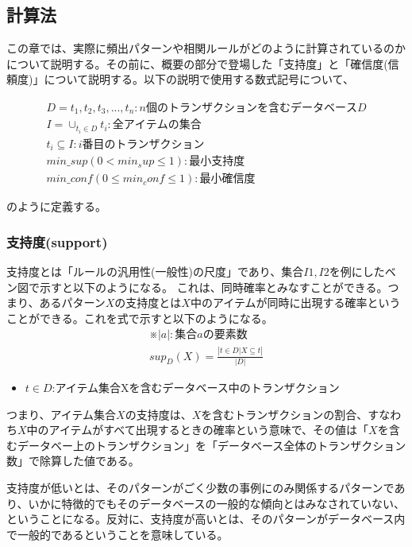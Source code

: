 \documentclass[dvipdfmx]{jsarticle}
\begin{document}
\subsection{計算法}
この章では、実際に頻出パターンや相関ルールがどのように計算されているのかについて説明する。その前に、概要の部分で登場した「支持度」と「確信度(信頼度)」について説明する。以下の説明で使用する数式記号について、
\begin{center}
  \begin{gather*}
    D = {t_{1}, t_{2}, t_{3},..., t_{n}}:n個のトランザクションを含むデータベースD\\
    I = \cup_{t_{i}\in D}t_{i}:全アイテムの集合 \\
    t_{i} \subseteq I:i番目のトランザクション \\
    min\_sup(0 < min_sup \le 1):最小支持度 \\
    min\_conf(0 \le min_conf \le 1):最小確信度
  \end{gather*}
\end{center}
のように定義する。
\subsubsection{支持度(support)}
支持度とは「ルールの汎用性(一般性)の尺度」であり、集合$I1, I2$を例にしたベン図で示すと以下のようになる。
これは、同時確率とみなすことができる。つまり、あるパターン$X$の支持度とは$X$中のアイテムが同時に出現する確率ということができる。これを式で示すと以下のようになる。
\begin{gather*}
  ※|a|:集合aの要素数\\
  sup_{D}(X) = \frac{|{t\in D|X\subseteq t}|}{|D|}
\end{gather*}
\begin{itemize}
  \item $t \in D$:アイテム集合Xを含むデータベース中のトランザクション
\end{itemize}
つまり、アイテム集合$X$の支持度は、$X$を含むトランザクションの割合、すなわち$X$中のアイテムがすべて出現するときの確率という意味で、その値は「$X$を含むデータベー上のトランザクション」を「データベース全体のトランザクション数」で除算した値である。\par
支持度が低いとは、そのパターンがごく少数の事例にのみ関係するパターンであり、いかに特徴的でもそのデータベースの一般的な傾向とはみなされていない、ということになる。反対に、支持度が高いとは、そのパターンがデータベース内で一般的であるということを意味している。
\end{document}
